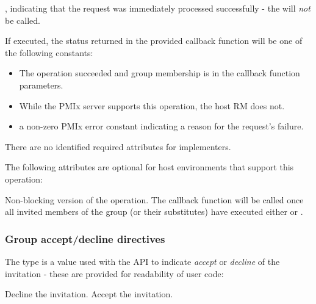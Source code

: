 \returnstart
\begin{constantdesc}
\item {}, indicating that the request was immediately processed successfully - the  will \textit{not} be called.
\end{constantdesc}
\returnend

If executed, the status returned in the provided callback function will be one of the following constants:

\begin{itemize}
\item {} The operation succeeded and group membership is in the callback function parameters.
\item {} While the \ac{PMIx} server supports this operation, the host \ac{RM} does not.
\item a non-zero \ac{PMIx} error constant indicating a reason for the request's failure.
\end{itemize}


\reqattrstart
There are no identified required attributes for implementers.

\reqattrend

\optattrstart
The following attributes are optional for host environments that support this operation:


\optattrend

\descr

Non-blocking version of the  operation. The callback function will be called once all invited members of the group (or their substitutes) have executed either  or .

\subsubsection{Group accept/decline directives}

The  type is a  value used with the  \ac{API} to indicate \emph{accept} or \emph{decline} of the invitation - these are provided for readability of user code:

\begin{constantdesc}
%
Decline the invitation.
%
Accept the invitation.
%
\end{constantdesc}


